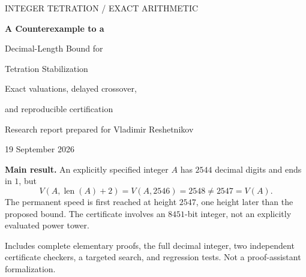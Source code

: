 \documentclass[11pt,a4paper]{article}
\theoremstyle{definition}
\theoremstyle{remark}
\newcommand{\len}{\operatorname{len}}
\begin{document}
\hypersetup{pageanchor=false}
\begin{titlepage}
\thispagestyle{empty}
\vspace*{9mm}
{\sffamily\large\color{Ink}INTEGER TETRATION \quad / \quad EXACT ARITHMETIC\par}
\vspace{14mm}
{\Huge\bfseries\color{Ink}A Counterexample to a\par Decimal-Length Bound for\par Tetration Stabilization\par}
\vspace{8mm}
{\Large Exact valuations, delayed crossover,\par and reproducible certification\par}
\vspace{13mm}
{\large Research report prepared for Vladimir Reshetnikov\par}
{\large 19 September 2026\par}
\vspace{10mm}
\begin{tcolorbox}[colback=Pale,colframe=Ink,boxrule=0.5pt,arc=1mm]
\textbf{Main result.} An explicitly specified integer $A$ has $2544$ decimal digits and ends in $1$, but
\[
 V(A,\len(A)+2)=V(A,2546)=2548\ne2547=V(A).
\]
The permanent speed is first reached at height $2547$, one height later than the proposed bound. The certificate involves an $8451$-bit integer, not an explicitly evaluated power tower.
\end{tcolorbox}
\vspace{6mm}
\begin{abstract}
A published conjecture of Rip\`a asserts that, for integer tetration bases whose last digit is neither $0$, $3$, nor $7$, the decimal congruence speed has reached its permanent value by height $\len(a)+2$. We give an explicit counterexample. The base is obtained by the Chinese remainder theorem from
$a\equiv1\pmod{5^{2547}}$ and $a\equiv-1\pmod{2^{2548}}$.
Exact arithmetic certifies that it has $2544$ digits and that its relevant valuations are $1$, $2548$, and $2547$. A self-contained lifting argument then gives the exact number of stable decimal places at every height as the minimum of two affine functions.

The report also derives a sharp stabilization criterion for all bases ending in $1$, exact precision thresholds, a consequence for pentation, and a periodicity formula for radices $2^u5^v$. The research-status audit is important: a later paper claims to confirm the conjecture. The present counterexample therefore corrects a published claim as well as refuting the conjectured statement. Historical priority is not established by this report.
\end{abstract}
\vfill
{\small\color{Ink}Includes complete elementary proofs, the full decimal integer, two independent certificate checkers, a targeted search, and regression tests. Not a proof-assistant formalization.}
\end{titlepage}
\hypersetup{pageanchor=true}
\end{document}

